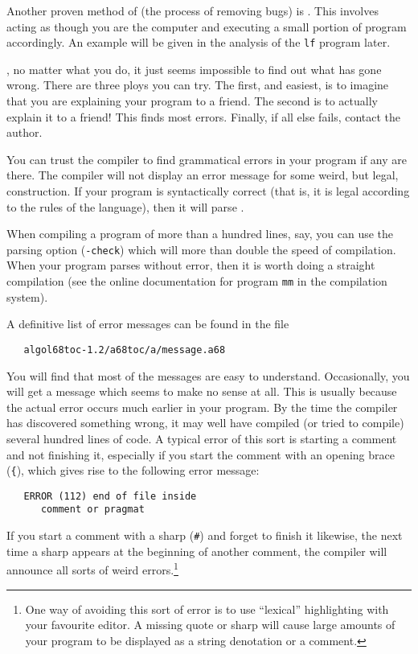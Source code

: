 Another proven method of  (the process of removing
bugs) is .  This involves acting as though you are
the computer and executing a small portion of program accordingly. An
example will be given in the analysis of the \verb|lf| program later.

, no matter what you do, it just seems
impossible to find out what has gone wrong.  There are three ploys you can
try.  The first, and easiest, is to imagine that you are explaining your
program to a friend.  The second is to actually explain it to a friend!
This finds most errors.  Finally, if all else fails, contact the
author.

You can trust the compiler to find grammatical errors in your program
if any are there. The compiler will not display an error message for
some weird, but legal, construction. If your program is syntactically
correct (that is, it is legal according to the rules of the
language), then it will parse .

When compiling a program of more than a hundred lines, say, you can use
the parsing option (\verb|-check|) which will more than double the
speed of compilation. When your program parses without error, then it
is worth doing a straight compilation (see the online documentation for
program \verb|mm| in the  compilation system).

A definitive list of error messages can be found in the file
\begin{verbatim}
   algol68toc-1.2/a68toc/a/message.a68
\end{verbatim}
\noindent
You will find that most of the messages are easy to understand.
Occasionally, you will get a message which seems to make no sense at
all. This is usually because the actual error occurs much earlier in
your program. By the time the compiler has discovered something
wrong, it may well have compiled (or tried to compile) several
hundred lines of code. A typical error of this sort is starting a
comment and not finishing it, especially if you start the comment
with an opening brace (\verb|{|), which gives rise to the following
error message:
\begin{verbatim}
   ERROR (112) end of file inside
      comment or pragmat
\end{verbatim}
\noindent
If you start a comment with a sharp (\verb|#|) and forget to finish it
likewise, the next time a sharp appears at the beginning of another
comment, the compiler will announce all sorts of weird
errors.\footnote{One way of avoiding this sort of error is to use
``lexical'' highlighting with your favourite editor. A missing quote
or sharp will cause large amounts of your program to be displayed as
a string denotation or a comment.}

